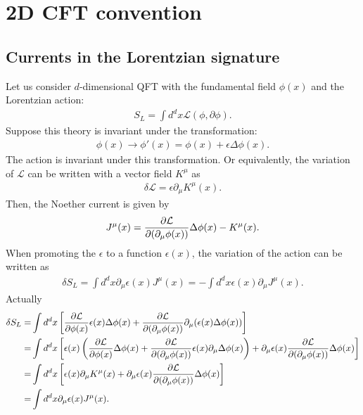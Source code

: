 \documentclass[12pt]{scrartcl}
\newcommand{\del}{\partial}
\newcommand{\Lcal}{\mathcal{L}}
\begin{document}
\section{2D CFT convention}


\appendix
\subsection{Currents in the Lorentzian signature}
Let us consider $d$-dimensional QFT with the fundamental field $\phi(x)$ and the Lorentzian action:
\begin{align}
    S_{L}=\int d^d x \Lcal(\phi,\del \phi).
\end{align}
Suppose this theory is invariant under the transformation:
\begin{align}
    \phi(x)\to \phi'(x)=\phi(x)+\epsilon \Delta \phi(x).
\end{align}
The action is invariant under this transformation.  Or equivalently, the variation of $\Lcal$ can be written with a vector field $K^{\mu}$ as
\begin{align}
    \delta \Lcal = \epsilon \del_{\mu}K^{\mu}(x).
\end{align}
Then, the Noether current is given by
\begin{align}
    J^{\mu}(x)=\pdv{\Lcal}{(\del_{\mu}\phi(x))} \Delta \phi(x)-K^{\mu}(x).
\end{align}
When promoting the $\epsilon$ to a function $\epsilon(x)$, the variation of the action can be written as
\begin{align}
    \delta S_{L}=\int d^d x \del_{\mu}\epsilon(x) J^{\mu}(x)=-\int d^d x \epsilon(x) \del_{\mu}J^{\mu}(x).
\end{align}
Actually
\begin{align}
    \delta S_{L}
    =&\int d^d x \left[
        \pdv{\Lcal}{\phi(x)}\epsilon(x)\Delta \phi(x)
        +\pdv{\Lcal}{(\del_{\mu}\phi(x))}\del_{\mu}(\epsilon(x)\Delta \phi(x))
    \right]\nonumber\\
    =&\int d^d x \left[\epsilon(x)\left(
        \pdv{\Lcal}{\phi(x)}\Delta \phi(x)
        +\pdv{\Lcal}{(\del_{\mu}\phi(x))}\epsilon(x)\del_{\mu}\Delta \phi(x)
        \right)
        +\del_{\mu}\epsilon(x)\pdv{\Lcal}{(\del_{\mu}\phi(x))}\Delta \phi(x)
    \right]\nonumber\\
    =&\int d^d x \left[\epsilon(x)\del_{\mu}K^{\mu}(x)
        +\del_{\mu}\epsilon(x)\pdv{\Lcal}{(\del_{\mu}\phi(x))}\Delta \phi(x)
    \right]\nonumber\\
    =&\int d^d x \del_{\mu}\epsilon(x) J^{\mu}(x).\nonumber\\
\end{align}
\end{document}
